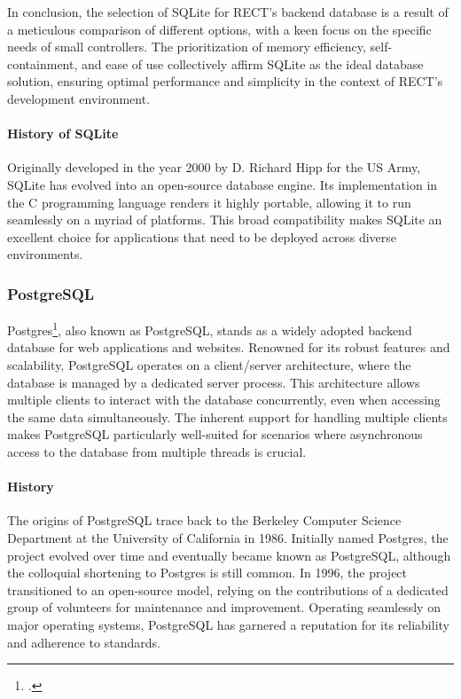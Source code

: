 In conclusion, the selection of SQLite for RECT's backend database is a result of a meticulous comparison of different options, with a keen focus on the 
specific needs of small controllers. The prioritization of memory efficiency, self-containment, and ease of use collectively affirm SQLite as the ideal database 
solution, ensuring optimal performance and simplicity in the context of RECT's development environment.

\paragraph{History of SQLite}
Originally developed in the year 2000 by D. Richard Hipp for the US Army, SQLite has evolved into an open-source database engine. Its implementation in the C 
programming language renders it highly portable, allowing it to run seamlessly on a myriad of platforms. This broad compatibility makes SQLite an excellent 
choice for applications that need to be deployed across diverse environments.\newline

\subsubsection{PostgreSQL}
Postgres\footcite{postgres}, also known as PostgreSQL, stands as a widely adopted backend database for web applications and websites. Renowned for its robust 
features and scalability, PostgreSQL operates on a client/server architecture, where the database is managed by a dedicated server process. This architecture 
allows multiple clients to interact with the database concurrently, even when accessing the same data simultaneously. The inherent support for handling multiple 
clients makes PostgreSQL particularly well-suited for scenarios where asynchronous access to the database from multiple threads is crucial.\newline

\paragraph{History}
The origins of PostgreSQL trace back to the Berkeley Computer Science Department at the University of California in 1986. Initially named Postgres, the project 
evolved over time and eventually became known as PostgreSQL, although the colloquial shortening to Postgres is still common. In 1996, the project transitioned 
to an open-source model, relying on the contributions of a dedicated group of volunteers for maintenance and improvement. Operating seamlessly on major 
operating systems, PostgreSQL has garnered a reputation for its reliability and adherence to standards.\newline

